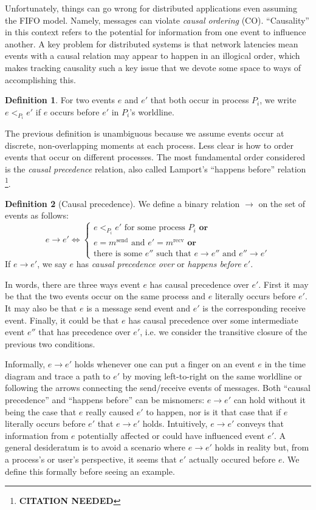 \documentclass[]             %
{NASA}                       %
\theoremstyle{definition}
\newtheorem{definition}{Definition}[section]
\newcommand{\citationneeded}{\footnote{\textbf{CITATION NEEDED}}}
\begin{document}
Unfortunately, things can go wrong for distributed applications even
assuming the FIFO model. Namely, messages can violate \emph{causal
  ordering} (CO). ``Causality'' in this context refers to the
potential for information from one event to influence another. A key
problem for distributed systems is that network latencies mean events
with a causal relation may appear to happen in an illogical order,
which makes tracking causality such a key issue that we devote some
space to ways of accomplishing this.

\begin{definition}
  For two events $e$ and $e'$ that both occur in process $P_i$, we
  write $e <_{P_i} e'$ if $e$ occurs before $e'$ in $P_i$'s
  worldline.
\end{definition}
The previous definition is unambiguous because we assume events occur
at discrete, non-overlapping moments at each process. Less clear is
how to order events that occur on different processes. The most
fundamental order considered is the \emph{causal precedence} relation,
also called Lamport's ``happens before'' relation \citationneeded.

\begin{definition}[Causal precedence]
  We define a binary relation $\to$ on the set of events as follows:
  \[e \to e' \iff
  \begin{cases}
    e <_{P_i} e' \textrm{ for some process $P_i$}
    \textbf{ or} \\
    e = m^\textrm{send} \textrm{ and } e' = m^\textrm{recv}
    \textbf{ or} \\
    \textrm{there is some } e'' \textrm{ such that } e \to e'' \textrm{ and } e'' \to e'
  \end{cases}
  \]
  If $e \to e'$, we say $e$ has \emph{causal precedence over} or
  \emph{happens before} $e'$.
\end{definition}%

In words, there are three ways event $e$ has causal precedence over
$e'$.  First it may be that the two events occur on the same process
and $e$ literally occurs before $e'$. It may also be that $e$ is a
message send event and $e'$ is the corresponding receive
event. Finally, it could be that $e$ has causal precedence over some
intermediate event $e''$ that has precedence over $e'$, i.e. we
consider the transitive closure of the previous two conditions.

Informally, $e \to e'$ holds whenever one can put a finger on an event
$e$ in the time diagram and trace a path to $e'$ by moving
left-to-right on the same worldline or following the arrows connecting
the send/receive events of messages. Both ``causal precedence'' and
``happens before'' can be misnomers: $e \to e'$ can hold without it
being the case that $e$ really caused $e'$ to happen, nor is it that
case that if $e$ literally occurs before $e'$ that $e \to e'$
holds. Intuitively, $e \to e'$ conveys that information from $e$
potentially affected or could have influenced event $e'$. A general
desideratum is to avoid a scenario where $e \to e'$ holds in reality
but, from a process's or user's perspective, it seems that $e'$
actually occured before $e$. We define this formally before seeing an
example.
\end{document}
